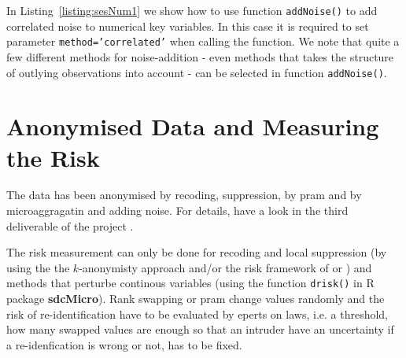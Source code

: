 \documentclass[12pt]{article}
\newcommand{\pkg}[1]{\textbf{#1}}
\newcommand{\proglang}[1]{\textsf{#1}}
\begin{document}
In Listing~\ref{listing:sesNum1} we show how to use function \lstinline{addNoise()} to add correlated noise to numerical key variables. In this case it is required to set parameter {\tt method='correlated'} when calling the function. We note that quite a few different methods for noise-addition - even methods that takes the structure of outlying observations into account - can be selected in function \lstinline{addNoise()}.






%
%
%


\section{Anonymised Data and Measuring the Risk} \label{sec:risk}

The data has been anonymised by recoding, suppression, by pram and by microaggragatin and adding noise. For details, have a look in the third 
deliverable of the project \citep{Meindl12del3}.

The risk measurement can only be done for recoding and local suppression (by using the the $k$-anonymisty approach and/or the 
risk framework of \cite{Rinott06} or \cite{manning08}) 
and methods that perturbe continous variables (using the function \lstinline{drisk()} in \proglang{R} \citep{Templ08d,Templ08f} 
package \pkg{sdcMicro}). Rank swapping or pram
change values randomly and the risk of re-identification have to be evaluated by eperts on laws, i.e. a 
threshold, how many swapped values are enough so that an intruder have an uncertainty if a re-idenfication is wrong or not, has to be fixed.
\end{document}
